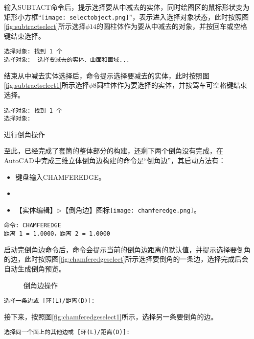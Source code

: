 \begin{procedure}
输入SUBTACT命令后，提示选择要从中减去的实体，同时绘图区的鼠标形状变为矩形小方框“\texttt{[image: selectobject.png]}”，表示进入选择对象状态，此时按照图\ref{fig:subtractselect}所示选择$\phi 14$的圆柱体作为要从中减去的对象，并按回车或空格键结束选择。
\begin{lstlisting}
选择对象: 找到 1 个
选择对象:  选择要减去的实体、曲面和面域...
\end{lstlisting}

结束从中减去实体选择后，命令提示选择要减去的实体，此时按照图\ref{fig:subtractselect1}所示选择$\phi 8$圆柱体作为要选择的实体，并按驾车可空格键结束选择。
\begin{lstlisting}
选择对象: 找到 1 个
选择对象:
\end{lstlisting}
\item 进行倒角操作

至此，已经完成了套筒的整体部分的构建，还剩下两个倒角没有完成，在AutoCAD中完成三维立体倒角边构建的命令是“倒角边”，其启动方法有：
\begin{itemize}
\item 键盘输入CHAMFEREDGE。
\item {}
\item 【实体编辑】$\triangleright$【倒角边】图标\texttt{[image: chamferedge.png]}。
\end{itemize}

\begin{lstlisting}
命令: CHAMFEREDGE
距离 1 = 1.0000，距离 2 = 1.0000
\end{lstlisting}

启动完倒角边命令后，命令会提示当前的倒角边距离的默认值，并提示选择要倒角的边，此时按照图\ref{fig:chamferedgeselect}所示选择要倒角的一条边，选择完成后会自动生成倒角预览。
\begin{figure}[htbp]
\centering
{}\hspace{20pt}
\hspace{20pt}
\caption{倒角边操作}
\end{figure}
\begin{lstlisting}
选择一条边或 [环(L)/距离(D)]:
\end{lstlisting}

接下来，按照图\ref{fig:chamferedgeselect1}所示，选择另一条要倒角的边。
\begin{lstlisting}
选择同一个面上的其他边或 [环(L)/距离(D)]:
\end{lstlisting}


\end{procedure}
